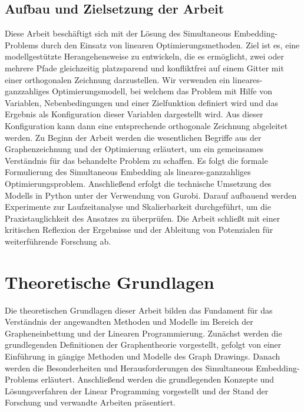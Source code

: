 \documentclass[bachelor, german]{algothesis}
\begin{document}
\section{Aufbau und Zielsetzung der Arbeit}
Diese Arbeit beschäftigt sich mit der Lösung des Simultaneous Embedding-Problems durch den Einsatz von linearen Optimierungsmethoden. Ziel ist es, eine modellgestützte Herangehensweise zu entwickeln, die es ermöglicht, zwei oder mehrere Pfade gleichzeitig platzsparend und konfliktfrei auf einem Gitter mit einer orthogonalen Zeichnung darzustellen. Wir verwenden ein lineares-ganzzahliges Optimierungsmodell, bei welchem das Problem mit Hilfe von Variablen, Nebenbedingungen und einer Zielfunktion definiert wird und das Ergebnis als Konfiguration dieser Variablen dargestellt wird. Aus dieser Konfiguration kann dann eine entsprechende orthogonale Zeichnung abgeleitet werden. \newline
Zu Beginn der Arbeit werden die wesentlichen Begriffe aus der Graphenzeichnung und der Optimierung erläutert, um ein gemeinsames Verständnis für das behandelte Problem zu schaffen. Es folgt die formale Formulierung des Simultaneous Embedding als lineares-ganzzahliges Optimierungsproblem. Anschließend erfolgt die technische Umsetzung des Modells in Python unter der Verwendung von Gurobi. Darauf aufbauend werden Experimente zur Laufzeitanalyse und Skalierbarkeit durchgeführt, um die Praxistauglichkeit des Ansatzes zu überprüfen. Die Arbeit schließt mit einer kritischen Reflexion der Ergebnisse und der Ableitung von Potenzialen für weiterführende Forschung ab.


\chapter{Theoretische Grundlagen}
Die theoretischen Grundlagen dieser Arbeit bilden das Fundament für das Verständnis der angewandten Methoden und Modelle im Bereich der Grapheneinbettung und der Linearen Programmierung. Zunächst werden die grundlegenden Definitionen der Graphentheorie vorgestellt, gefolgt von einer Einführung in gängige Methoden und Modelle des Graph Drawings. Danach werden die Besonderheiten und Herausforderungen des Simultaneous Embedding-Problems erläutert. Anschließend werden die grundlegenden Konzepte und Lösungsverfahren der Linear Programming vorgestellt und der Stand der Forschung und verwandte Arbeiten präsentiert.
\end{document}
